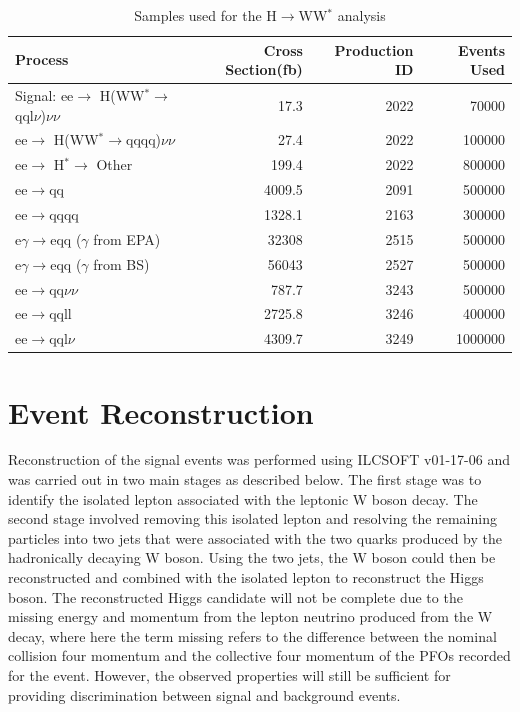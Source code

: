 \begin{table}
  \centering
  \begin{tabular}{l r r r}
   \toprule
    Process     & Cross Section(fb)  &   Production ID\cite{bib-prodids}    & Events Used    \\
    \midrule
    Signal: ee$\rightarrow$ H(WW$^*\rightarrow$qql$\nu$)$\nu\nu$             &   17.3  &  2022  & 70000  \\ 
    \midrule
    ee$\rightarrow$ H(WW$^*\rightarrow$qqqq)$\nu\nu$                &   27.4  &  2022    & 100000 \\
    \midrule
    ee$\rightarrow$ H$^*\rightarrow$ Other & 199.4 & 2022 & 800000  \\
    \midrule
    ee$\rightarrow$qq               & 4009.5    &  2091  & 500000  \\ 
    \midrule
    ee$\rightarrow$qqqq               & 1328.1    &  2163  & 300000  \\ 
    \midrule
    e$\gamma$$\rightarrow$eqq ($\gamma$ from EPA)                 & 32308    &  2515 & 500000   \\ 
    \midrule
    e$\gamma$$\rightarrow$eqq ($\gamma$ from BS)               & 56043  &  2527  & 500000 \\ 
    \midrule
    ee$\rightarrow$qq$\nu\nu$               & 787.7    &  3243 & 500000   \\ 
    \midrule
    ee$\rightarrow$qqll               & 2725.8    &  3246  & 400000  \\ 
    \midrule
    ee$\rightarrow$qql$\nu$              & 4309.7    &  3249 & 1000000   \\ 
    \bottomrule
  \end{tabular}
  \caption[Samples used for the H$\rightarrow$WW$^*$ analysis]{Samples used for the H$\rightarrow$WW$^*$ analysis}
  \label{fig:higgsbackgrounds}
\end{table}


\section{Event Reconstruction}

Reconstruction of the signal events was performed using ILCSOFT v01-17-06 and was carried out in two main stages as described below. The first stage was to identify the isolated lepton associated with the leptonic W boson decay. The second stage involved removing this isolated lepton and resolving the remaining particles into two jets that were associated with the two quarks produced by the hadronically decaying W boson. Using the two jets, the W boson could then be reconstructed and combined with the isolated lepton to reconstruct the Higgs boson. The reconstructed Higgs candidate will not be complete due to the missing energy and momentum from the lepton neutrino produced from the W decay, where here the term missing refers to the difference between the nominal collision four momentum and the collective four momentum of the \ac{PFO}s recorded for the event. However, the observed properties will still be sufficient for providing discrimination between signal and background events.


